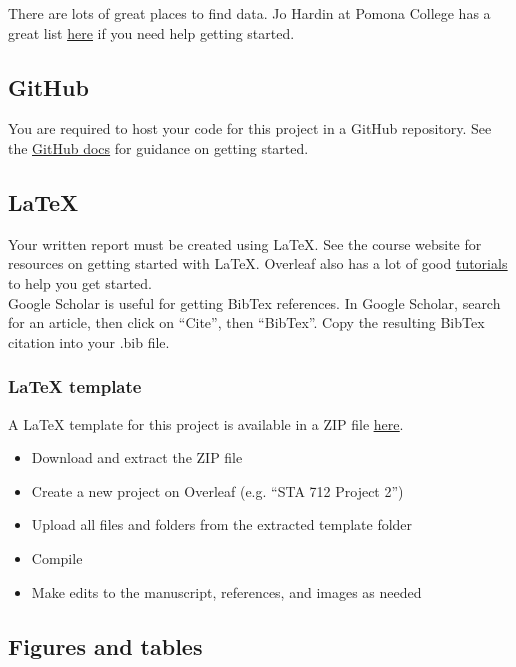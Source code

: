 \documentclass[11pt]{article}
\begin{document}
There are lots of great places to find data. Jo Hardin at Pomona College has a great list \href{https://hardin47.netlify.app/courses/data/}{\underline{here}} if you need help getting started.

\subsection*{GitHub}

You are required to host your code for this project in a GitHub repository. See the \href{https://docs.github.com/en/get-started/quickstart/hello-world}{\underline{GitHub docs}} for guidance on getting started.

\subsection*{LaTeX}

Your written report must be created using LaTeX. See the course website for resources on getting started with LaTeX. Overleaf also has a lot of good \href{https://www.overleaf.com/learn/latex/Tutorials}{\underline{tutorials}} to help you get started.\\

\noindent Google Scholar is useful for getting BibTex references. In Google Scholar, search for an article, then click on ``Cite'', then ``BibTex''. Copy the resulting BibTex citation into your .bib file.

\subsubsection*{LaTeX template}

A LaTeX template for this project is available in a ZIP file \href{https://sta712-f23.github.io/projects/report_template.zip}{\underline{here}}.

\begin{itemize}
\item Download and extract the ZIP file
\item Create a new project on Overleaf (e.g. ``STA 712 Project 2'')
\item Upload all files and folders from the extracted template folder
\item Compile
\item Make edits to the manuscript, references, and images as needed
\end{itemize}

\subsection*{Figures and tables}
\end{document}
